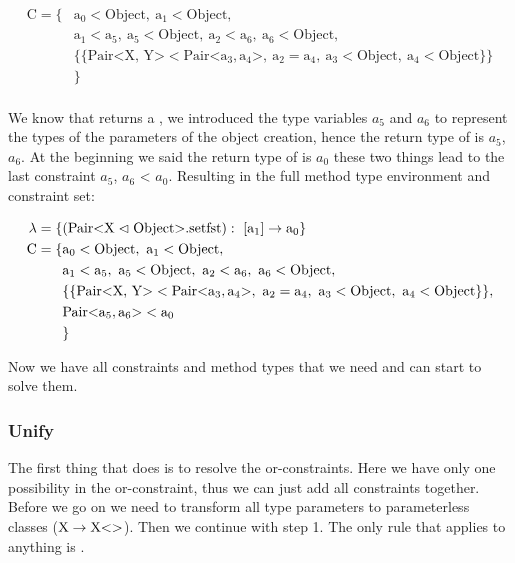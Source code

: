 \begin{align*}
    \text{C} = \{& \text{a}_0 < \text{Object}, \ \text{a}_1 < \text{Object}, \\
    &\text{a}_1 < \text{a}_5, \ \text{a}_5 < \text{Object}, \ \text{a}_2 < \text{a}_6, \ \text{a}_6 < \text{Object}, \\
    & \{ \{ \text{Pair<X, Y>} < \text{Pair<} \text{a}_3, \text{a}_4 \text{>}, \ \text{a}_2 = \text{a}_4, \ \text{a}_3 < \text{Object}, \ \text{a}_4 < \text{Object} \} \} \\
    &\}\\
\end{align*}

We know that  returns a , we introduced the type variables $a_5$ and $a_6$ to represent the types of the parameters of the object creation, hence the return type of  is $a_5$, $a_6$\inl{>}.
At the beginning we said the return type of  is $a_0$ these two things lead to the last constraint $a_5$, $a_6$\inl{>} < $a_0$.
Resulting in the full method type environment and constraint set:

\begin{align*}
    \lambda = \{& ( \cxnm{Pair}{X}{Object}{setfst} ): \ [\text{a}_1] \to \text{a}_0 \}\\
    \text{C} = \{& \text{a}_0 < \text{Object}, \ \text{a}_1 < \text{Object}, \\
    &\text{a}_1 < \text{a}_5, \ \text{a}_5 < \text{Object}, \ \text{a}_2 < \text{a}_6, \ \text{a}_6 < \text{Object}, \\
    & \{ \{ \text{Pair<X, Y>} < \text{Pair<} \text{a}_3, \text{a}_4 \text{>}, \ \text{a}_2 = \text{a}_4, \ \text{a}_3 < \text{Object}, \ \text{a}_4 < \text{Object} \} \},\\
    &\text{Pair<}\text{a}_5, \text{a}_6\text{>} < \text{a}_0\\
    &\}\\
\end{align*}

Now we have all constraints and method types that we need and can start to solve them.

\subsubsection{Unify}
The first thing that  does is to resolve the or-constraints. Here we have only one possibility in the or-constraint, thus we can just add all constraints together.
Before we go on we need to transform all type parameters to parameterless classes ($\text{X} \to \text{X} \text{<}  \text{>}$).
Then we continue with step 1. The only rule that applies to anything is .

